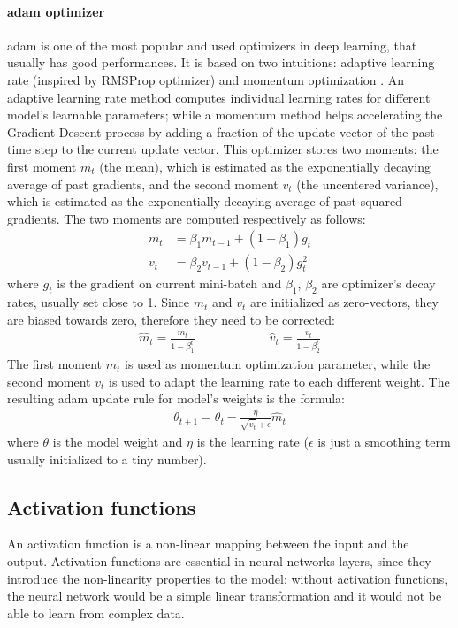\paragraph{\acs{adam} optimizer} \acs{adam} is one of the most popular and used optimizers in deep learning, that usually has good performances. It is based on two intuitions: adaptive learning rate (inspired by RMSProp optimizer) and momentum optimization \cite{arXiv:adam} \cite{arXiv:optimizers}. An adaptive learning rate method computes individual learning rates for different model's learnable parameters; while a momentum method helps accelerating the Gradient Descent process by adding a fraction of the update vector of the past time step to the current update vector. This optimizer stores two moments: the first moment $m_t$ (the mean), which is estimated as the exponentially decaying average of past gradients, and the second moment $v_t$ (the uncentered variance), which is estimated as the exponentially decaying average of past squared gradients. The two moments are computed respectively as follows:
\begin{align}
    m_{t} &=\beta_{1} m_{t-1}+\left(1-\beta_{1}\right) g_{t} \\
    v_{t} &=\beta_{2} v_{t-1}+\left(1-\beta_{2}\right) g_{t}^{2}
\end{align}
where $g_{t}$ is the gradient on current mini-batch and $\beta_1$, $\beta_2$ are optimizer's decay rates, usually set close to 1. Since $m_t$ and $v_t$ are initialized as zero-vectors, they are biased towards zero, therefore they need to be corrected:
\begin{align}
    \hat{m}_{t} =\frac{m_{t}}{1-\beta_{1}^{t}} \qquad\qquad\qquad
    \hat{v}_{t} =\frac{v_{t}}{1-\beta_{2}^{t}}
\end{align}
The first moment $m_t$ is used as momentum optimization parameter, while the second moment $v_t$ is used to adapt the learning rate to each different weight. The resulting \acs{adam} update rule for model's weights is the formula:
\begin{align}
    \theta_{t+1}=\theta_{t}-\frac{\eta}{\sqrt{\hat{v}_{t}}+\epsilon} \hat{m}_{t}
\end{align}
where $\theta$ is the model weight and $\eta$ is the learning rate ($\epsilon$ is just a smoothing term usually initialized to a tiny number).


\subsection{Activation functions}
An activation function is a non-linear mapping between the input and the output. Activation functions are essential in neural networks layers, since they introduce the non-linearity properties to the model: without activation functions, the neural network would be a simple linear transformation and it would not be able to learn from complex data.

